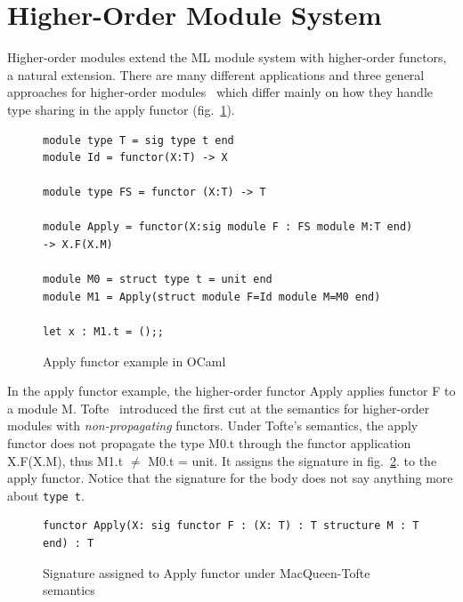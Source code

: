\section{Higher-Order Module System}\label{sec:hofct}
	Higher-order modules extend the ML module system with higher-order functors, a natural extension. There are many different applications and three general approaches for higher-order modules~ \cite{tofte92,tofte:jfp94,mt94,biswas95,leroy95,Leroy:generativity,LillibridgeThesis,russothesis,dreyerthesis} which differ mainly on how they handle type sharing in the apply functor (fig.~\ref{fig:applyfctocaml}). 

\begin{figure} 
\begin{lstlisting}[style=ocamlcode]
module type T = sig type t end
module Id = functor(X:T) -> X

module type FS = functor (X:T) -> T

module Apply = functor(X:sig module F : FS module M:T end) -> X.F(X.M)

module M0 = struct type t = unit end	
module M1 = Apply(struct module F=Id module M=M0 end)

let x : M1.t = ();;
\end{lstlisting}
\caption{Apply functor example in OCaml}
\label{fig:applyfctocaml}
\end{figure}
		
In the apply functor example, the higher-order functor Apply applies functor F to a module M. Tofte~\cite{tofte92} introduced the first cut at the semantics for higher-order modules with \emph{non-propagating} functors. Under Tofte's semantics, the apply functor does not propagate the type M0.t through the functor application X.F(X.M), thus M1.t $\ne$ M0.t = unit. It assigns the signature in fig.~\ref{fig:tofteapplysig}. to the apply functor. Notice that the signature for the body does not say anything more about \lstinline{type t}. 
\begin{figure}
\begin{lstlisting}
functor Apply(X: sig functor F : (X: T) : T structure M : T end) : T
\end{lstlisting}
\caption{Signature assigned to Apply functor under MacQueen-Tofte semantics}
\label{fig:tofteapplysig}
\end{figure}


